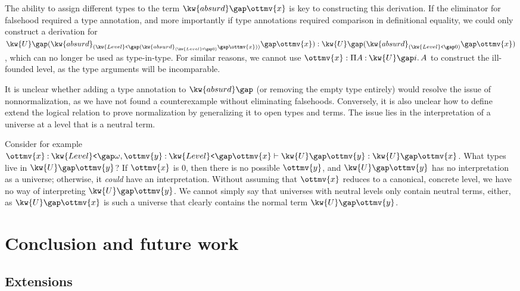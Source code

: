 \documentclass[a4paper,UKenglish,cleveref,autoref,thm-restate]{lipics-v2021}
\begin{document}
The ability to assign different types to the term $ \kw{absurd} \gap  \ottmv{x} $ is key to constructing this derivation.
If the eliminator for falsehood required a type annotation,
and more importantly if type annotations required comparison in definitional equality,
we could only construct a derivation for
$ \kw{U} \gap   (  \kw{absurd}_{  (  \kw{Level}\texttt{<} \gap   (  \kw{absurd}_{  (  \kw{Level}\texttt{<} \gap   0   )  } \gap  \ottmv{x}  )   )  } \gap  \ottmv{x}  )   :  \kw{U} \gap   (  \kw{absurd}_{  (  \kw{Level}\texttt{<} \gap   0   )  } \gap  \ottmv{x}  )  $,
which can no longer be used as type-in-type.
For similar reasons, we cannot use $\ottmv{x} :  \Pi  A  \mathbin{:}   \kw{U} \gap  i   \mathpunct{.}  A $
to construct the ill-founded level, as the type arguments will be incomparable.

It is unclear whether adding a type annotation to $ \kw{absurd} \gap   \relax  $
(or removing the empty type entirely) would resolve the issue of nonnormalization,
as we have not found a counterexample without eliminating falsehoods.
Conversely, it is also unclear how to define extend the logical relation to prove normalization
by generalizing it to open types and terms.
The issue lies in the interpretation of a universe at a level that is a neutral term.

Consider for example $   \ottmv{x}  \mathbin{:}   \kw{Level}\texttt{<} \gap   \omega    ,  \ottmv{y}  \mathbin{:}   \kw{Level}\texttt{<} \gap  \ottmv{x}    \vdash   \kw{U} \gap  \ottmv{y}   \mathrel{:}   \kw{U} \gap  \ottmv{x}  $.
What types live in $ \kw{U} \gap  \ottmv{y} $?
If $\ottmv{x}$ is $0$, then there is no possible $\ottmv{y}$,
and $ \kw{U} \gap  \ottmv{y} $ has no interpretation as a universe;
otherwise, it \emph{could} have an interpretation.
Without assuming that $\ottmv{x}$ reduces to a canonical, concrete level,
we have no way of interpreting $ \kw{U} \gap  \ottmv{y} $.
We cannot simply say that universes with neutral levels only contain neutral terms, either,
as $ \kw{U} \gap  \ottmv{x} $ is such a universe that clearly contains the normal term $ \kw{U} \gap  \ottmv{y} $.

\section{Conclusion and future work}

\subsection{Extensions}
\end{document}
